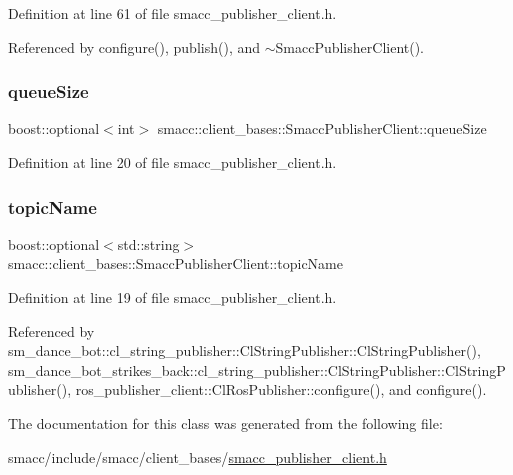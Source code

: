 Definition at line 61 of file smacc\+\_\+publisher\+\_\+client.\+h.



Referenced by configure(), publish(), and $\sim$\+Smacc\+Publisher\+Client().

\mbox{\label{classsmacc_1_1client__bases_1_1SmaccPublisherClient_a1a9b98681b01953f134191799a029fd3}} 
\subsubsection{\texorpdfstring{queue\+Size}{queueSize}}
{\footnotesize\ttfamily boost\+::optional$<$int$>$ smacc\+::client\+\_\+bases\+::\+Smacc\+Publisher\+Client\+::queue\+Size}



Definition at line 20 of file smacc\+\_\+publisher\+\_\+client.\+h.

\mbox{\label{classsmacc_1_1client__bases_1_1SmaccPublisherClient_a8b8d98aef9b3b3a441005d2cb17b4fcc}} 
\subsubsection{\texorpdfstring{topic\+Name}{topicName}}
{\footnotesize\ttfamily boost\+::optional$<$std\+::string$>$ smacc\+::client\+\_\+bases\+::\+Smacc\+Publisher\+Client\+::topic\+Name}



Definition at line 19 of file smacc\+\_\+publisher\+\_\+client.\+h.



Referenced by sm\+\_\+dance\+\_\+bot\+::cl\+\_\+string\+\_\+publisher\+::\+Cl\+String\+Publisher\+::\+Cl\+String\+Publisher(), sm\+\_\+dance\+\_\+bot\+\_\+strikes\+\_\+back\+::cl\+\_\+string\+\_\+publisher\+::\+Cl\+String\+Publisher\+::\+Cl\+String\+Publisher(), ros\+\_\+publisher\+\_\+client\+::\+Cl\+Ros\+Publisher\+::configure(), and configure().



The documentation for this class was generated from the following file\+:\begin{DoxyCompactItemize}
\item 
smacc/include/smacc/client\+\_\+bases/\hyperlink{smacc__publisher__client_8h}{smacc\+\_\+publisher\+\_\+client.\+h}\end{DoxyCompactItemize}
